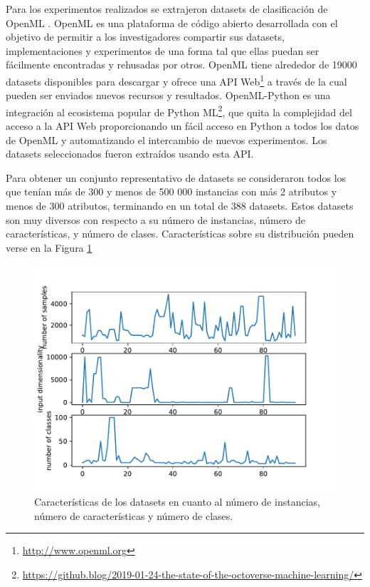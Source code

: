 Para los experimentos realizados se extrajeron datasets de clasificación de OpenML \cite{vanschoren2014openml}. OpenML es una plataforma de código abierto desarrollada con el objetivo de permitir a los investigadores compartir sus datasets, implementaciones y experimentos de una forma tal que ellas puedan ser fácilmente encontradas y rehusadas por otros. OpenML tiene alrededor de 19000 datasets disponibles para descargar y ofrece una API Web\footnote{\url{http://www.openml.org}} a través de la cual pueden ser enviados nuevos recursos y resultados. OpenML-Python \cite{feurer2019openmlpy} es una integración al ecosistema popular de Python ML\footnote{\url{https://github.blog/2019-01-24-the-state-of-the-octoverse-machine-learning/}}, que quita la complejidad del acceso a la API Web proporcionando un fácil acceso en Python a todos los datos de OpenML y automatizando el intercambio de nuevos experimentos. Los datasets seleccionados fueron extraídos usando esta API.
 
 Para obtener un conjunto representativo de datasets se consideraron todos los que tenían más de 300  y menos de 500 000 instancias con más 2 atributos y menos de 300 atributos, terminando en un total de 388 datasets. Estos datasets son muy diversos con respecto a su número de instancias, número de características, y número de clases. Características sobre su distribución pueden verse en la Figura \ref{fig:datasets}
 
 \begin{figure}[H]
\centering
\includegraphics[scale=.75]{Figures/mtf-lineplot.pdf}
\caption{Características de los datasets en cuanto al número de instancias, número de características y número de clases.}
\label{fig:datasets}
\end{figure}
 
